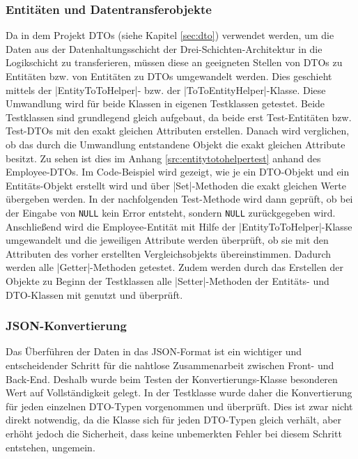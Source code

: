 \subsubsection{Entitäten und Datentransferobjekte}

Da in dem Projekt \acsp{DTO} (siehe Kapitel \vref{sec:dto}) verwendet werden, um die Daten aus der Datenhaltungsschicht der Drei-Schichten-Architektur in die Logikschicht zu transferieren, müssen diese an geeigneten Stellen von \acsp{DTO} zu Entitäten bzw. von Entitäten zu \acsp{DTO} umgewandelt werden.
Dies geschieht mittels der \jinline |EntityToToHelper|- bzw. der \jinline |ToToEntityHelper|-Klasse.
Diese Umwandlung wird für beide Klassen in eigenen Testklassen getestet.
Beide Testklassen sind grundlegend gleich aufgebaut, da beide erst Test-Entitäten bzw. Test-\acsp{DTO} mit den exakt gleichen Attributen erstellen.
Danach wird verglichen, ob das durch die Umwandlung entstandene Objekt die exakt gleichen Attribute besitzt.
Zu sehen ist dies im Anhang \vref{src:entitytotohelpertest} anhand des Employee-\acsp{DTO}.
Im Code-Beispiel wird gezeigt, wie je ein \acs{DTO}-Objekt und ein Entitäts-Objekt erstellt wird und über \jinline |Set|-Methoden die exakt gleichen Werte übergeben werden.
In der nachfolgenden Test-Methode wird dann geprüft, ob bei der Eingabe von \texttt{NULL} kein Error entsteht, sondern \texttt{NULL} zurückgegeben wird.
Anschließend wird die Employee-Entität mit Hilfe der \jinline |EntityToToHelper|-Klasse umgewandelt und die jeweiligen Attribute werden überprüft, ob sie mit den Attributen des vorher erstellten Vergleichsobjekts übereinstimmen.
Dadurch werden alle \jinline |Getter|-Methoden getestet.
Zudem werden durch das Erstellen der Objekte zu Beginn der Testklassen alle \jinline |Setter|-Methoden der Entitäts- und \acs{DTO}-Klassen mit genutzt und überprüft.

\subsubsection{JSON-Konvertierung}

Das Überführen der Daten in das \acs{JSON}-Format ist ein wichtiger und entscheidender Schritt für die nahtlose Zusammenarbeit zwischen Front- und Back-End.
Deshalb wurde beim Testen der Konvertierungs-Klasse besonderen Wert auf Vollständigkeit gelegt.
In der Testklasse wurde daher die Konvertierung für jeden einzelnen \acs{DTO}-Typen vorgenommen und überprüft.
Dies ist zwar nicht direkt notwendig, da die Klasse sich für jeden \acs{DTO}-Typen gleich verhält, aber erhöht jedoch die Sicherheit, dass keine unbemerkten Fehler bei diesem Schritt entstehen, ungemein.


